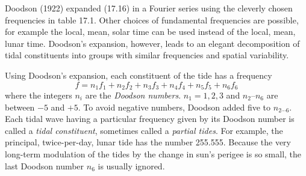Doodson (1922) expanded (17.16) in a Fourier series using the cleverly
chosen frequencies in table 17.1. Other choices of fundamental
frequencies are possible, for example the local, mean, solar time can
be used instead of the local, mean, lunar time. Doodson's expansion,
however, leads to an elegant decomposition of tidal constituents into
groups with similar frequencies and spatial variability.

Using Doodson's expansion, each constituent of the tide has a
frequency
\begin{equation}
f = n_1 f_1 + n_2 f_2 + n_3 f_3 + n_4 f_4 + n_5 f_5 + n_6 f_6
\end{equation}
where the integers $n_i$ are the \textit{Doodson
  numbers}. $n_1 = 1, 2, 3 $ and $n_2$--$n_6$ are between $-5$
and $+5$. To avoid negative numbers, Doodson added five to $n_{2
  \cdots 6}$. Each tidal wave having a particular frequency given by
its Doodson number is called a \textit{tidal
  constituent}, sometimes called a
\textit{partial tides}. For example, the
principal, twice-per-day, lunar tide has the number 255.555. Because
the very long-term modulation of the tides by the change in sun's
perigee is so small, the last Doodson number $n_6$ is usually ignored.

